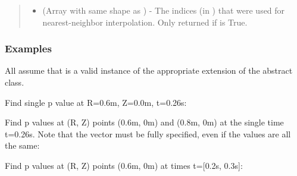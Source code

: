 \documentclass[letterpaper,10pt,english]{sphinxmanual}
\begin{document}
\begin{fulllineitems}
\begin{fulllineitems}
\begin{quote}
\begin{description}
\begin{itemize}
\item {} 
 (Array with same shape as ) - The indices
(in ) that were used for
nearest-neighbor interpolation. Only returned if  is
True.

\end{itemize}


\end{description}\end{quote}
\subsubsection*{Examples}

All assume that  is a valid instance of the
appropriate extension of the {\hyperref[\detokenize{eqtools:eqtools.core.Equilibrium}]{}} abstract class.

Find single p value at R=0.6m, Z=0.0m, t=0.26s:

\begin{sphinxVerbatim}[commandchars=\\\{\}]
    
\end{sphinxVerbatim}

Find p values at (R, Z) points (0.6m, 0m) and (0.8m, 0m) at the
single time t=0.26s. Note that the  vector must be fully specified,
even if the values are all the same:

\begin{sphinxVerbatim}[commandchars=\\\{\}]
  \PYG{p}{[} \PYG{p}{]} \PYG{p}{[} \PYG{p}{]} 
\end{sphinxVerbatim}

Find p values at (R, Z) points (0.6m, 0m) at times t={[}0.2s, 0.3s{]}:

\begin{sphinxVerbatim}[commandchars=\\\{\}]
    \PYG{p}{[} \PYG{p}{]}
\end{sphinxVerbatim}


\end{fulllineitems}
\end{fulllineitems}
\end{document}
